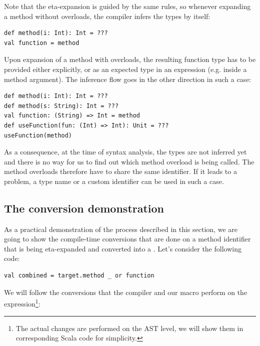 Note that the eta-expansion is guided by the same rules, so whenever expanding a method without overloads, the compiler infers the types by itself:
\lstset{style=Scala}
\begin{lstlisting}
def method(i: Int): Int = ???
val function = method
\end{lstlisting}

Upon expansion of a method with overloads, the resulting function type has to be provided either explicitly, or as an expected type in an expression (e.g. inside a method argument). The inference flow goes in the other direction in such a case:
\lstset{style=Scala}
\begin{lstlisting}
def method(i: Int): Int = ???
def method(s: String): Int = ???
val function: (String) => Int = method
def useFunction(fun: (Int) => Int): Unit = ???
useFunction(method)
\end{lstlisting}

As a consequence, at the time of syntax analysis, the types are not inferred yet and there is no way for us to find out which method overload is being called. The method overloads therefore have to share the same identifier. If it leads to a problem, a type name or a custom identifier can be used in such a case.

\subsection{The conversion demonstration}

As a practical demonstration of the process described in this section, we are going to show the compile-time conversions that are done on a method identifier that is being eta-expanded and converted into a . Let's consider the following code:

\lstset{style=Scala}
\begin{lstlisting}
val combined = target.method _ or function
\end{lstlisting}

We will follow the conversions that the compiler and our macro perform on the  expression\footnote{The actual changes are performed on the AST level, we will show them in corresponding Scala code for simplicity.}:

